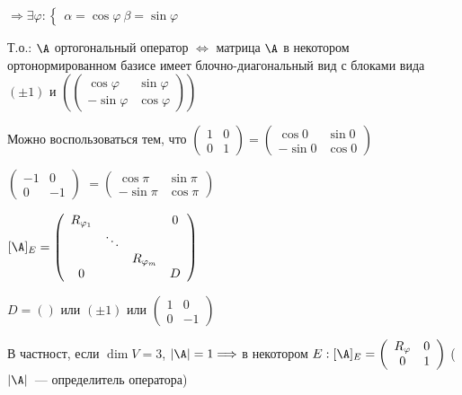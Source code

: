 $ \Longrightarrow \exists \varphi : \begin{cases}
    \alpha = \cos{\varphi} \
    \beta = \sin{\varphi}
\end{cases} $

Т.о.: $\A$ ортогональный оператор $\Longleftrightarrow$ матрица $\A$ в некотором ортонормированном базисе имеет блочно-диагональный вид с блоками вида $(\pm 1)$ и $( \left(\begin{array}{cc}
\cos{\varphi} & \sin{\varphi} \\ 
-\sin{\varphi} & \cos{\varphi}
\end{array}\right) )$

Можно воспользоваться тем, что $\left(\begin{array}{cc}
1 & 0 \\ 
0 & 1
\end{array}\right) = \left(\begin{array}{cc}
\cos{0} & \sin{0} \\ 
-\sin{0} & \cos{0}
\end{array}\right)$

$ \left(\begin{array}{cc}
-1 & 0 \\
0 & -1
\end{array}\right)$
$= \left(\begin{array}{cc}
    \cos{\pi} & \sin{\pi} \\
    -\sin{\pi} & \cos{\pi}
    \end{array}\right)$

$[\A]_{E} = \left(\begin{array}{cccc}
R_{\varphi_1} &  &  & 0 \\ 
 & \ddots &  &  \\ 
 &  & R_{\varphi_m} &  \\ 
0 &  &  & D
\end{array}\right)$

$D = ()$ или $(\pm 1)$ или $\left(\begin{array}{cc}
    1 & 0 \\ 
    0 & -1
    \end{array}\right)$

В частност, если $\dim V = 3$, $| \A | = 1 \Longrightarrow$ в некотором $E : [\A]_{E} = \left(\begin{array}{cc}
R_{\varphi} & 0 \\ 
0 & 1 
\end{array}\right)$ ($| \A |$~--- определитель оператора) %

